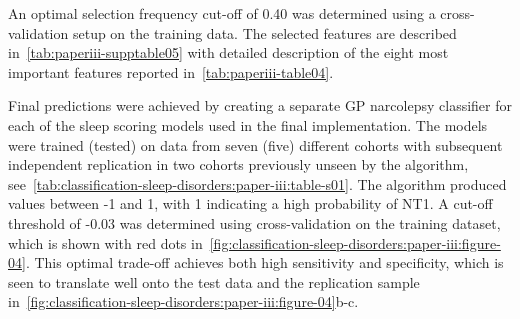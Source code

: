 An optimal selection frequency cut-off of 0.40 was determined using a cross-validation setup on the training data. 
The selected features are described in~\cref{tab:paperiii-supptable05} with detailed description of the eight most important features reported in~\cref{tab:paperiii-table04}.

Final predictions were achieved by creating a separate \ac{GP} narcolepsy classifier for each of the sleep scoring models used in the final implementation. 
The models were trained (tested) on data from seven (five) different cohorts with subsequent independent replication in two cohorts previously unseen by the algorithm, see~\cref{tab:classification-sleep-disorders:paper-iii:table-s01}.
The algorithm produced values between -1 and 1, with 1 indicating a high probability of \ac{NT1}.
A cut-off threshold of -0.03 was determined using cross-validation on the training dataset, which is shown with red dots in~\cref{fig:classification-sleep-disorders:paper-iii:figure-04}. 
This optimal trade-off achieves both high sensitivity and specificity, which is seen to translate well onto the test data and the replication sample in~\cref{fig:classification-sleep-disorders:paper-iii:figure-04}b-c.


